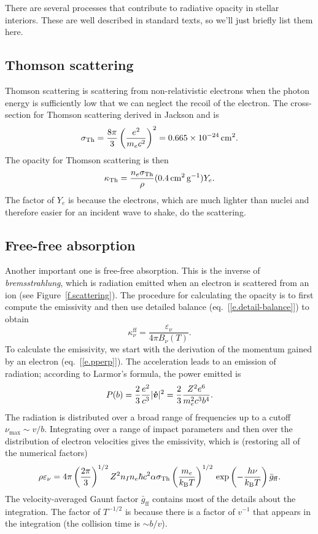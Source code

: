 There are several processes that contribute to radiative opacity in stellar interiors.  These are well described in standard texts, so we'll just briefly list them here.

\subsection{Thomson scattering}
Thomson scattering is scattering from non-relativistic electrons when the photon energy is sufficiently low that we can neglect the recoil of the electron.  The cross-section for Thomson scattering derived in Jackson and is 
\begin{equation}\label{e.Thomson-cross-section}
\sigma_{\mathrm{Th}} = \frac{8\pi}{3}\left(\frac{e^{2}}{m_{e}c^{2}}\right)^{2} = 0.665 \times 10^{-24} \,\mathrm{c}\mathrm{m}^{2}.
\end{equation}
The opacity for Thomson scattering is then
\[ \kappa_{\mathrm{Th}} = \frac{n_{e}\sigma_{\mathrm{Th}}}{\rho} (0.4\,\mathrm{c}\mathrm{m}^{2}\,\mathrm{g}^{-1}) Y_{e}. \]
The factor of $Y_{e}$ is because the electrons, which are much lighter than nuclei and therefore easier for an incident wave to shake, do the scattering.

\subsection{Free-free absorption}
Another important one is free-free absorption. This is the inverse of \emph{bremsstrahlung}, which is radiation emitted when an electron is scattered from an ion (see Figure~\ref{f.scattering}). The procedure for calculating the opacity is to first compute the emissivity and then use detailed balance (eq.~[\ref{e.detail-balance}]) to obtain
\[ \kappa_{\nu}^{\mathrm{ff}} = \frac{\varepsilon_{\nu}}{4\pi B_{\nu}(T)} . \] 
To calculate the emissivity, we start with the derivation of the momentum gained by an electron (eq.~[\ref{e.pperp}]).  The acceleration leads to an emission of radiation; according to Larmor's formula, the power emitted is
\begin{equation}\label{e.larmor}
P(b) = \frac{2}{3}\frac{e^{2}}{c^{3}} |\boldsymbol{\dot{v}}|^{2} = \frac{2}{3}\frac{Z^{2}e^{6}}{m_{e}^{2}c^{3}b^{4}}.
\end{equation}
The radiation is distributed over a broad range of frequencies up to a cutoff $\nu_{\max}\sim v/b$. Integrating over a range of impact parameters and then over the distribution of electron velocities gives the emissivity, which is (restoring all of the numerical factors)
\begin{equation}\label{e.free-free-w}
\rho \varepsilon_{\nu} = 4\pi\left(\frac{2\pi}{3}\right)^{1/2}Z^{2}n_{I}n_{e} \hbar c^{2}  \alpha \sigma_{\mathrm{Th}} \left(\frac{m_{e}}{k_\mathrm{B} T}\right)^{1/2}\,\exp\left(-\frac{h\nu}{k_\mathrm{B} T}\right) \bar{g}_{\mathrm{ff}}.
\end{equation}
The velocity-averaged Gaunt factor $\bar{g}_{\mathrm{ff}}$ contains most of the details about the integration. The factor of $T^{-1/2}$ is because there is a factor of $v^{-1}$ that appears in the integration (the collision time is $\sim b/v$).  


